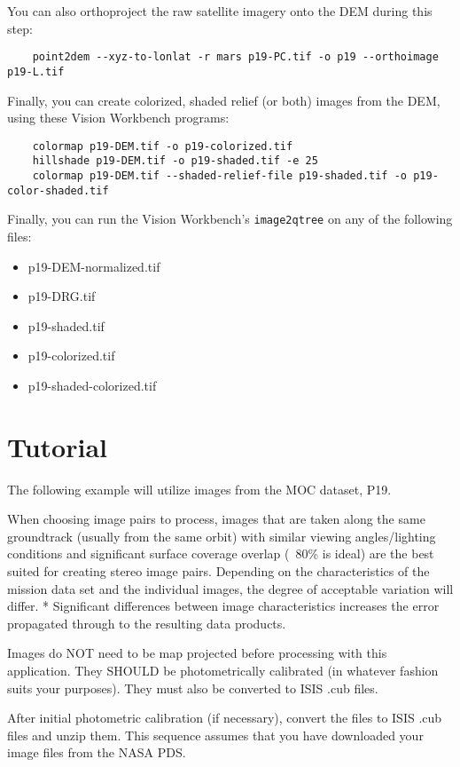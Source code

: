 You can also orthoproject the raw satellite imagery onto the DEM during this step:

\begin{verbatim}
	point2dem --xyz-to-lonlat -r mars p19-PC.tif -o p19 --orthoimage p19-L.tif
\end{verbatim}

Finally, you can create colorized, shaded relief (or both) images from the DEM, using these Vision Workbench programs:

\begin{verbatim}
	colormap p19-DEM.tif -o p19-colorized.tif
	hillshade p19-DEM.tif -o p19-shaded.tif -e 25
	colormap p19-DEM.tif --shaded-relief-file p19-shaded.tif -o p19-color-shaded.tif
\end{verbatim}

Finally, you can run the Vision Workbench's \texttt{image2qtree} on any of the following files:

\begin{itemize}
\item p19-DEM-normalized.tif
\item p19-DRG.tif 
\item p19-shaded.tif
\item p19-colorized.tif
\item p19-shaded-colorized.tif
\end{itemize}


\section{Tutorial}

The following example will utilize images from the MOC dataset, P19.

When choosing image pairs to process, images that are taken along
the same groundtrack (usually from the same orbit) with similar
viewing angles/lighting conditions and significant surface coverage
overlap (~80\% is ideal) are the best suited for creating stereo
image pairs. Depending on the characteristics of the mission data
set and the individual images, the degree of acceptable variation
will differ. * Significant differences between image characteristics
increases the error propagated through to the resulting data products.

Images do NOT need to be map projected before processing with this
application. They SHOULD be photometrically calibrated (in whatever
fashion suits your purposes). They must also be converted to ISIS
.cub files.

After initial photometric calibration (if necessary), convert the
files to ISIS .cub files and unzip them. This sequence assumes that
you have downloaded your image files from the NASA PDS.


